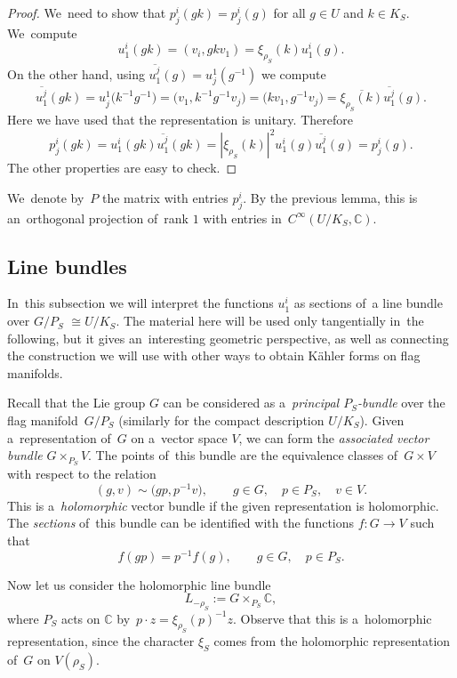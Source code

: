 \documentclass[10pt,a4paper]{amsart}
\numberwithin{equation}{section}
\newcommand{\bbC}{\mathbb{C}}
\newcommand{\weiS}{\rho_S}
\newcommand{\charS}{\xi_{\weiS}}
\begin{document}
\begin{proof}
We~need to show that $p^i_j(g k) = p^i_j(g)$ for all $g \in U$ and $k \in K_S$. We~compute
\[
u^i_1(g k) = (v_i, g k v_1) = \charS(k) u^i_1(g).
\]
On the other hand, using $\overline{u^j_1}(g) = {u^1_j}(g^{-1})$ we compute
\[
\overline{u^j_1}(g k) = {u^1_j}\big(k^{-1} g^{-1}\big) = \big(v_1, k^{-1} g^{-1} v_j\big) = \big(k v_1, g^{-1} v_j\big) = \overline{\charS(k)} \overline{u^j_1}(g).
\]
Here we have used that the representation is unitary. Therefore
\[
p^i_j(g k) = u^i_1(g k) \overline{u^j_1}(g k) = |\charS(k)|^2 u^i_1(g) \overline{u^j_1}(g) = p^i_j(g).
\]
The other properties are easy to check.
\end{proof}

We~denote by~$P$ the matrix with entries $p^i_j$.
By the previous lemma, this is an~orthogonal projection of~rank $1$ with entries in~$C^\infty(U / K_S, \bbC)$.

\subsection{Line bundles}

In~this subsection we will interpret the functions $u^i_1$ as sections of~a line bundle over $G / P_S$ $\cong U / K_S$.
The material here will be used only tangentially in~the following, but it gives an~inte\-res\-ting geometric perspective, as well as connecting the construction we will use with other ways to obtain K\"ahler forms on flag manifolds.

Recall that the Lie group $G$ can be considered as a~\emph{principal $P_S$-bundle} over the flag manifold~$G / P_S$ (similarly for the compact description $U / K_S$).
Given a~representation of~$G$ on a~vector space $V$, we can form the \emph{associated vector bundle} $G \times_{P_S} V$.
The points of~this bundle are the equivalence classes of~$G \times V$ with respect to the relation
\[
(g, v) \sim \big(g p, p^{-1} v\big), \qquad
g \in G, \quad p \in P_S, \quad v \in V.
\]
This is a~\emph{holomorphic} vector bundle if the given representation is holomorphic.
The \emph{sections} of~this bundle can be identified with the functions $f\colon G \to V$ such that
\[
f(g p) = p^{-1} f(g), \qquad g \in G, \quad p \in P_S.
\]

Now let us consider the holomorphic line bundle
\[
L_{-\rho_S} := G \times_{P_S} \bbC,
\]
where $P_S$ acts on $\bbC$ by~$p \cdot z = \charS(p)^{-1} z$.
Observe that this is a~holomorphic representation, since the character $\xi_S$ comes from the holomorphic representation of~$G$ on $V(\rho_S)$.
\end{document}
